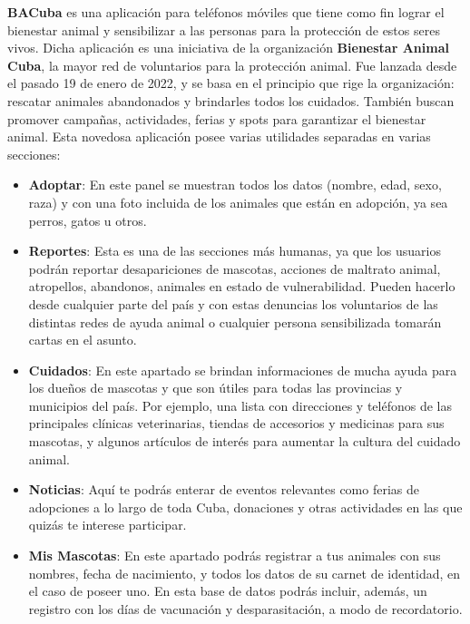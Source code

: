\textbf{ BACuba}  es una aplicación para teléfonos móviles que tiene como fin lograr el bienestar animal y sensibilizar a las personas para la protección de estos seres vivos. Dicha aplicación es una iniciativa de la organización \textbf{Bienestar Animal Cuba}, la mayor red de voluntarios para la protección animal. Fue lanzada desde el pasado 19 de enero de 2022, y se basa en el principio que rige la organización: rescatar animales abandonados y brindarles todos los cuidados. También buscan promover campañas, actividades, ferias y spots para garantizar el bienestar animal. Esta novedosa aplicación posee varias utilidades separadas en varias secciones:

\begin{itemize}
	\item \textbf {Adoptar}: En este panel se muestran todos los datos (nombre, edad, sexo, raza) y con una foto incluida de los animales que están en adopción, ya sea perros, gatos u otros.
	\item \textbf{ Reportes}: Esta es una de las secciones más humanas, ya que los usuarios podrán reportar desapariciones de mascotas, acciones de maltrato animal, atropellos, abandonos, animales en estado de vulnerabilidad. Pueden hacerlo desde cualquier parte del país y con estas denuncias los voluntarios de las distintas redes de ayuda animal o cualquier persona sensibilizada tomarán cartas en el asunto.
	\item \textbf{Cuidados}: En este apartado se brindan informaciones de mucha ayuda para los dueños de mascotas y que son útiles para todas las provincias y municipios del país. Por ejemplo, una lista con direcciones y teléfonos de las principales clínicas veterinarias, tiendas de accesorios y medicinas para sus mascotas, y algunos artículos de interés para aumentar la cultura del cuidado animal.
	\item \textbf{Noticias}: Aquí te podrás enterar de eventos relevantes como ferias de adopciones a lo largo de toda Cuba, donaciones y otras actividades en las que quizás te interese participar.
	\item \textbf{Mis Mascotas}: En este apartado podrás registrar a tus animales con sus nombres, fecha de nacimiento, y todos los datos de su carnet de identidad, en el caso de poseer uno. En esta base de datos podrás incluir, además, un registro con los días de vacunación y desparasitación, a modo de recordatorio.
\end{itemize}

